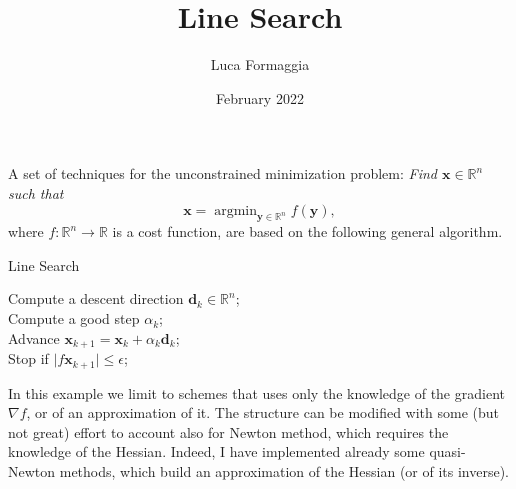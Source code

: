 \documentclass{article}
\author{Luca Formaggia}
\title{Line Search}
\date{February 2022}
\begin{document}
\maketitle
A set of techniques for the unconstrained minimization problem: \emph{Find $\mathbf{x}\in \mathbb{R}^n$
such that}
\[
\mathbf{x}=\operatorname{argmin}_{\mathbf{y}\in\mathbb{R}^n} f(\mathbf{y}),
\]
where $f:\mathbb{R}^n\to\mathbb{R}$ is a cost function, are based on the following general algorithm.
\begin{algorithm}
    \caption{Line Search}
Compute a descent direction $\mathbf{d}_k\in\mathbb{R}^n$;\\
Compute a good step $\alpha_k$;\\
Advance $\mathbf{x}_{k+1}=\mathbf{x}_k+\alpha_k\mathbf{d}_k$;\\
Stop if $\vert f\mathbf{x}_{k+1}\vert\le\epsilon$;\\
\end{algorithm}

In this example we limit to schemes that uses only the knowledge of the gradient $\nabla f$, or of an approximation of it. The structure can be modified with some (but not great) effort to account also for Newton method, which requires the knowledge of the Hessian.
Indeed, I have implemented already some quasi-Newton methods, which build an approximation of the Hessian (or of its inverse).
\end{document}
